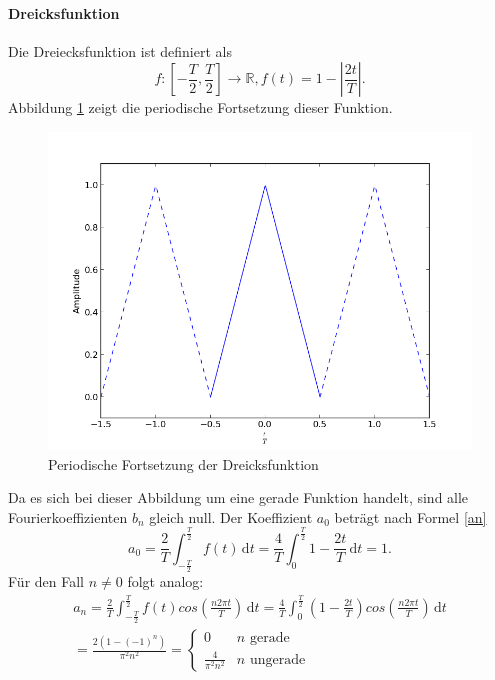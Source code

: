 \documentclass[11pt,ngerman,a4paper]{article}
\begin{document}
\paragraph{Dreicksfunktion}
Die Dreiecksfunktion ist definiert als
\begin{equation}
f \colon  \left[-\frac{T}{2}, \frac{T}{2}\right]\to \mathbb{R}, f(t) = 1 - \left|\frac{2t}{T}\right|.
\end{equation}
Abbildung \ref{org_hut} zeigt die periodische Fortsetzung dieser Funktion.
\begin{figure}[htp]
\centering
\includegraphics[scale=0.7]{abb/Abb2.png}
\caption{Periodische Fortsetzung der Dreicksfunktion}
\label{org_hut}
\end{figure} Da es sich bei dieser Abbildung um eine gerade Funktion handelt, sind alle Fourierkoeffizienten $b_n$ gleich null. Der Koeffizient $a_0$ betr\"agt nach Formel \ref{an}
\begin{equation} 
a_0 =\frac{2}{T} \int_{-\frac{T}{2}}^{\frac{T}2}\!f(t)\,\mathrm dt= \frac4T \int_{0}^{\frac{T}2}\!1-\frac{2t}{T}\,\mathrm dt= 1.
\end{equation}
F\"ur den Fall $n \neq 0$ folgt analog:
\begin{align}
a_n =\frac{2}{T} \int_{-\frac{T}{2}}^{\frac{T}2}\!f(t)cos\left(\frac{n2\pi t}{T}\right) \,\mathrm dt = \frac{4}{T} \int_0^\frac{T}2\!\left(1-\frac{2t}{T}\right)cos\left(\frac{n2\pi t}{T}\right)\,\mathrm dt \\= \frac{2 (1-(-1)^n)}{\pi^2n^2} = \begin{cases}
0 & n\mbox{ gerade} \\ \frac{4}{\pi^2n^2} & n\mbox{ ungerade}
\end{cases}
\end{align} 
\end{document}
